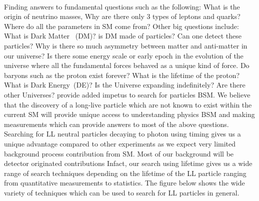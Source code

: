 {\paragraph*{}
 Finding answers to fundamental questions such as the following: What is the origin of neutrino masses, Why are there only 3 types of leptons and quarks? Where do all the parameters in SM come from? Other big questions include: What is Dark Matter ~(DM)? is DM made of particles? Can one detect these particles? Why is there so much asymmetry between matter and anti-matter in our universe? Is there some energy scale or early epoch in the evolution of the universe where all the fundamental forces behaved as a unique kind of force. Do baryons such as the proton exist forever? What is the lifetime of the proton? What is Dark Energy~(DE)? Is the Universe expanding indefinitely? Are there other Universes? 
 provide added impetus to search for particles BSM. We believe that the discovery of a long-live particle which are not known to exist within the current SM will provide unique access to understanding physics BSM and making measurements which can provide answers to most of the above questions.
\newline{}
Searching for LL neutral particles decaying to photon using timing gives us a unique advantage compared to other experiments as we expect very limited background process contribution from SM. Most of our background will be detector originated contributions
Infact, our search using lifetime gives us a wide range of search techniques  depending on the lifetime of the LL particle ranging from quantitative measurements to statistics. The figure below  shows the wide variety of techniques which can be used to search for LL particles in general.
}
